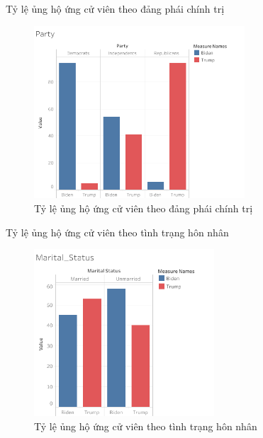 \documentclass[10pt]{beamer}
\theoremstyle{remark}
\theoremstyle{definition}
\begin{document}
\begin{frame}{Tỷ lệ ủng hộ ứng cử viên theo đảng phái chính trị}
	\begin{figure}[h!]
        \centering
        \includegraphics[width=0.7\textwidth]{figures/Party.png}
        \caption{Tỷ lệ ủng hộ ứng cử viên theo đảng phái chính trị}
    \end{figure}
\end{frame}


\begin{frame}{Tỷ lệ ủng hộ ứng cử viên theo tình trạng hôn nhân}
	\begin{figure}[h!]
        \centering
        \includegraphics[width=0.6\textwidth]{figures/Marital_Status.png}
        \caption{Tỷ lệ ủng hộ ứng cử viên theo tình trạng hôn nhân}
    \end{figure}
\end{frame}
\end{document}
